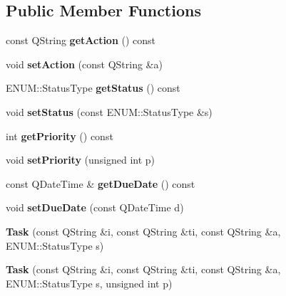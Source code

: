 \subsection*{Public Member Functions}
\begin{DoxyCompactItemize}
\item 
\mbox{\label{class_task_a96c7968f19216f99d2be8258379276f8}} 
const Q\+String {\bfseries get\+Action} () const
\item 
\mbox{\label{class_task_ab46558546f384adf2fb713a65d38c075}} 
void {\bfseries set\+Action} (const Q\+String \&a)
\item 
\mbox{\label{class_task_aad7d467ac985d8244ac86d1359652056}} 
E\+N\+U\+M\+::\+Status\+Type {\bfseries get\+Status} () const
\item 
\mbox{\label{class_task_a16849e80ace9effc32551461b4cc9633}} 
void {\bfseries set\+Status} (const E\+N\+U\+M\+::\+Status\+Type \&s)
\item 
\mbox{\label{class_task_adf87b0c5cebcf623ecf56cea17c6fede}} 
int {\bfseries get\+Priority} () const
\item 
\mbox{\label{class_task_ada0cc34c125efd9fc373d3ca25be6013}} 
void {\bfseries set\+Priority} (unsigned int p)
\item 
\mbox{\label{class_task_aebc4bcb056771f66180b3cffe91d17c3}} 
const Q\+Date\+Time \& {\bfseries get\+Due\+Date} () const
\item 
\mbox{\label{class_task_a8867a97698ad38810e3d53a924b4c1b3}} 
void {\bfseries set\+Due\+Date} (const Q\+Date\+Time d)
\item 
\mbox{\label{class_task_a78d0578c5477a26b89dc2db1dd4752e2}} 
{\bfseries Task} (const Q\+String \&i, const Q\+String \&ti, const Q\+String \&a, E\+N\+U\+M\+::\+Status\+Type s)
\item 
\mbox{\label{class_task_ac2c486f798fcdc263a77420448f9e276}} 
{\bfseries Task} (const Q\+String \&i, const Q\+String \&ti, const Q\+String \&a, E\+N\+U\+M\+::\+Status\+Type s, unsigned int p)

\end{DoxyCompactItemize}
